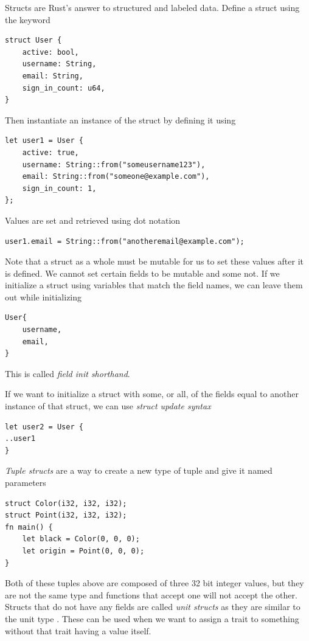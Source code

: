 \documentclass[]{article}
\begin{document}
Structs are Rust's answer to structured and labeled data.
Define a struct using the keyword 
\begin{verbatim}
struct User {
    active: bool,
    username: String,
    email: String,
    sign_in_count: u64,
}
\end{verbatim}
Then instantiate an instance of the struct by defining it using 
\begin{verbatim}
let user1 = User {
    active: true,
    username: String::from("someusername123"),
    email: String::from("someone@example​.­com"),
    sign_in_count: 1,
};
\end{verbatim}
Values are set and retrieved using dot notation
\begin{verbatim}
user1.email = String::from("anotheremail@example​.­com");
\end{verbatim}
Note that a struct as a whole must be mutable for us to set these values after it is defined.
We cannot set certain fields to be mutable and some not.
If we initialize a struct using variables that match the field names, we can leave them out while initializing
\begin{verbatim}
User{
    username,
    email,
}
\end{verbatim}
This is called \emph{field init shorthand}.

If we want to initialize a struct with some, or all, of the fields equal to another instance of that struct, we can use \emph{struct update syntax}
\begin{verbatim}
let user2 = User {
..user1
}
\end{verbatim}

\emph{Tuple structs} are a way to create a new type of tuple and give it named parameters
\begin{verbatim}
struct Color(i32, i32, i32);
struct Point(i32, i32, i32);
fn main() {
    let black = Color(0, 0, 0);
    let origin = Point(0, 0, 0);
}
\end{verbatim}
Both of these tuples above are composed of three 32 bit integer values, but they are not the same type and functions that accept one will not accept the other.
Structs that do not have any fields are called \emph{unit structs} as they are similar to the unit type \code{()}.
These can be used when we want to assign a trait to something without that trait having a value itself.
\end{document}
